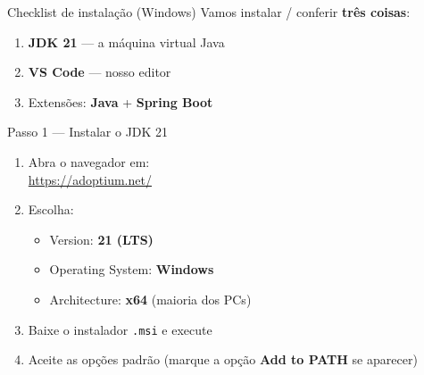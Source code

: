 \documentclass[aspectratio=169,11pt]{beamer}
\begin{document}
\begin{frame}{Checklist de instalação (Windows)}
  Vamos instalar / conferir \textbf{três coisas}:

  \vspace{0.6em}
  \begin{enumerate}
    \item \textbf{JDK 21} --- a máquina virtual Java
    \item \textbf{VS Code} --- nosso editor
    \item Extensões: \textbf{Java} + \textbf{Spring Boot}
  \end{enumerate}

  \vspace{0.8em}
\end{frame}

\begin{frame}{Passo 1 --- Instalar o JDK 21}
  \begin{enumerate}
    \item Abra o navegador em:\\
          \url{https://adoptium.net/}
    \item Escolha:
      \begin{itemize}
        \item Version: \textbf{21 (LTS)}
        \item Operating System: \textbf{Windows}
        \item Architecture: \textbf{x64} (maioria dos PCs)
      \end{itemize}
    \item Baixe o instalador \texttt{.msi} e execute
    \item Aceite as opções padrão (marque a opção \textbf{Add to PATH} se aparecer)
  \end{enumerate}
\end{frame}
\end{document}
